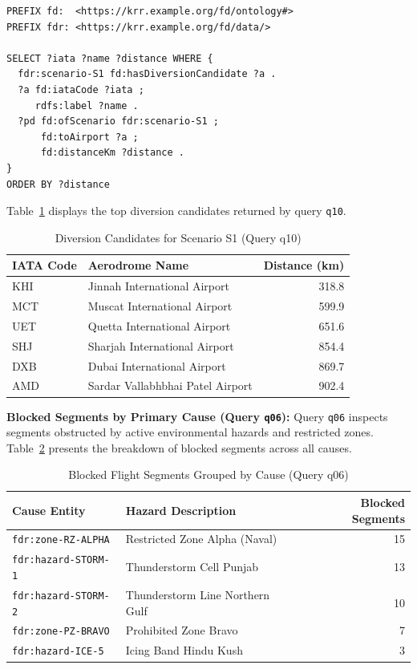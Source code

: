 \documentclass[conference]{IEEEtran}
\begin{document}
\begin{lstlisting}[language=SPARQL, caption={Query q10: Diversion Candidates for Scenario S1}, label={lst:q10}]
PREFIX fd:  <https://krr.example.org/fd/ontology#>
PREFIX fdr: <https://krr.example.org/fd/data/>

SELECT ?iata ?name ?distance WHERE {
  fdr:scenario-S1 fd:hasDiversionCandidate ?a .
  ?a fd:iataCode ?iata ;
     rdfs:label ?name .
  ?pd fd:ofScenario fdr:scenario-S1 ;
      fd:toAirport ?a ;
      fd:distanceKm ?distance .
}
ORDER BY ?distance
\end{lstlisting}

Table~\ref{tab:q10_results} displays the top diversion candidates returned by query \texttt{q10}.

\begin{table}[htbp]
\caption{Diversion Candidates for Scenario S1 (Query q10)}
\label{tab:q10_results}
\centering
\begin{tabular}{llr}
\toprule
\textbf{IATA Code} & \textbf{Aerodrome Name} & \textbf{Distance (km)} \\
\midrule
KHI & Jinnah International Airport & 318.8 \\
MCT & Muscat International Airport & 599.9 \\
UET & Quetta International Airport & 651.6 \\
SHJ & Sharjah International Airport & 854.4 \\
DXB & Dubai International Airport & 869.7 \\
AMD & Sardar Vallabhbhai Patel Airport & 902.4 \\
\bottomrule
\end{tabular}
\end{table}

\textbf{Blocked Segments by Primary Cause (Query \texttt{q06}):}
Query \texttt{q06} inspects segments obstructed by active environmental hazards and restricted zones. Table~\ref{tab:q06_results} presents the breakdown of blocked segments across all causes.

\begin{table}[htbp]
\caption{Blocked Flight Segments Grouped by Cause (Query q06)}
\label{tab:q06_results}
\centering
\begin{tabular}{llr}
\toprule
\textbf{Cause Entity} & \textbf{Hazard Description} & \textbf{Blocked Segments} \\
\midrule
\texttt{fdr:zone-RZ-ALPHA} & Restricted Zone Alpha (Naval) & 15 \\
\texttt{fdr:hazard-STORM-1} & Thunderstorm Cell Punjab & 13 \\
\texttt{fdr:hazard-STORM-2} & Thunderstorm Line Northern Gulf & 10 \\
\texttt{fdr:zone-PZ-BRAVO} & Prohibited Zone Bravo & 7 \\
\texttt{fdr:hazard-ICE-5} & Icing Band Hindu Kush & 3 \\
\bottomrule
\end{tabular}
\end{table}
\end{document}
